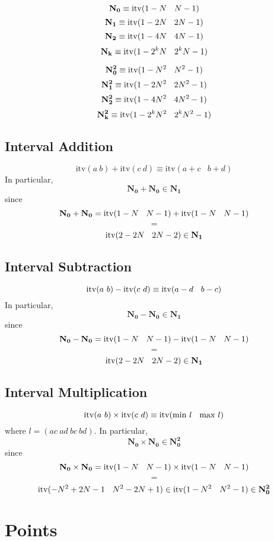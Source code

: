 \documentclass{article}
\begin{document}
\newcommand{\NO}{\mathbf{N_0}}
\newcommand{\NI}{\mathbf{N_1}}
\newcommand{\NII}{\mathbf{N_2}}
\newcommand{\NIII}{\mathbf{N_3}}
\newcommand{\NK}{\mathbf{N_k}}

\newcommand{\NN}{\mathbf{N_0^2}}
\newcommand{\NNI}{\mathbf{N_1^2}}
\newcommand{\NNII}{\mathbf{N_2^2}}
\newcommand{\NNK}{\mathbf{N_k^2}}

$$\NO\equiv \mathrm{itv}(1-N\en N-1)$$
$$\NI\equiv \mathrm{itv}(1-2N\en 2N-1)$$
$$\NII\equiv \mathrm{itv}(1-4N\en 4N-1)$$
$$\NK\equiv \mathrm{itv}(1-2^kN\en 2^kN-1)$$

$$\NN\equiv \mathrm{itv}(1-N^2\en N^2-1)$$
$$\NNI\equiv \mathrm{itv}(1-2N^2\en 2N^2-1)$$
$$\NNII\equiv \mathrm{itv}(1-4N^2\en 4N^2-1)$$
$$\NNK\equiv \mathrm{itv}(1-2^kN^2\en 2^kN^2-1)$$

\subsection{Interval Addition}

$$\mathrm{itv}(a\ b) + \mathrm{itv}(c\ d) \equiv
\mathrm{itv}(a+c\phantom{N}b+d)$$
\noindent
In particular,
$$\NO+\NO\in\NI$$
since
$$\NO+\NO=\mathrm{itv}(1-N\en N-1) + \mathrm{itv}(1-N\en N-1)$$
$$=$$
$$\mathrm{itv}(2-2N\en 2N-2)\in
\mathbf{N_1}$$

\subsection{Interval Subtraction}

$$\mathrm{itv}(a\ b) - \mathrm{itv}(c\ d) \equiv
\mathrm{itv}(a-d\en b-c)$$
In particular,
$$\NO-\NO\in\NI$$
since
$$\NO-\NO=\mathrm{itv}(1-N\en N-1) - \mathrm{itv}(1-N\en N-1)$$
$$=$$
$$\mathrm{itv}(2-2N\en 2N-2)\in
\mathbf{N_1}$$

\subsection{Interval Multiplication}

$$\mathrm{itv}(a\ b) \times \mathrm{itv}(c\ d) \equiv
\mathrm{itv}(\mathrm{min}\ l\en \mathrm{max}\ l)$$
where $l=(ac\ ad\ bc\ bd)$.
In particular,
$$\NO\times\NO\in\NN$$
since
$$\NO\times\NO=\mathrm{itv}(1-N\en N-1) \times \mathrm{itv}(1-N\en N-1)$$
$$=$$
$$\mathrm{itv}(-N^2+2N-1\en N^2-2N+1)\in
\mathrm{itv}(1-N^2\en N^2-1)\in\NN$$

\section{Points}
\end{document}
